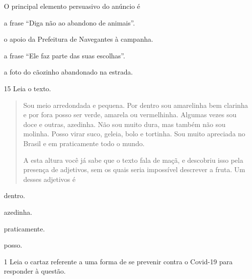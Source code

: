O principal elemento persuasivo do anúncio é

\begin{escolha}
\item a frase ``Diga não ao abandono de animais''.

\item o apoio da Prefeitura de Navegantes à campanha.

\item a frase ``Ele faz parte das suas escolhas''.

\item a foto do cãozinho abandonado na estrada.
\end{escolha}


\num{15} Leia o texto.

\begin{quote}
Sou meio arredondada e pequena. Por dentro sou amarelinha bem clarinha e
por fora posso ser verde, amarela ou vermelhinha. Algumas vezes sou doce
e outras, azedinha. Não sou muito dura, mas também não sou molinha.
Posso virar suco, geleia, bolo e tortinha. Sou muito apreciada no Brasil
e em praticamente todo o mundo.

A esta altura você já sabe que o texto fala de maçã, e descobriu isso
pela presença de adjetivos, sem os quais seria impossível descrever a
fruta. Um desses adjetivos é
\end{quote}

\begin{escolha}
\item dentro.

\item azedinha.

\item praticamente.

\item posso.
\end{escolha}

\vspace*{-3.4cm}

\num{1} Leia o cartaz referente a uma forma de se prevenir contra o Covid-19
para responder à questão.


